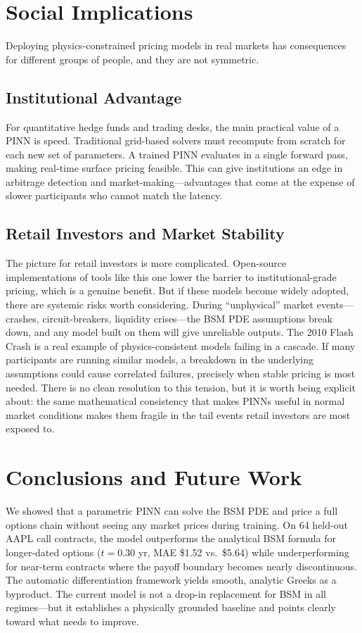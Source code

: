 \documentclass[11pt, twocolumn]{article}
\begin{document}
\section{Social Implications}
Deploying physics-constrained pricing models in real markets has consequences for different groups of people, and they are not symmetric.

\subsection{Institutional Advantage}
For quantitative hedge funds and trading desks, the main practical value of a PINN is speed. Traditional grid-based solvers must recompute from scratch for each new set of parameters. A trained PINN evaluates in a single forward pass, making real-time surface pricing feasible. This can give institutions an edge in arbitrage detection and market-making—advantages that come at the expense of slower participants who cannot match the latency.

\subsection{Retail Investors and Market Stability}
The picture for retail investors is more complicated. Open-source implementations of tools like this one lower the barrier to institutional-grade pricing, which is a genuine benefit. But if these models become widely adopted, there are systemic risks worth considering. During ``unphysical'' market events—crashes, circuit-breakers, liquidity crises—the BSM PDE assumptions break down, and any model built on them will give unreliable outputs. The 2010 Flash Crash is a real example of physics-consistent models failing in a cascade. If many participants are running similar models, a breakdown in the underlying assumptions could cause correlated failures, precisely when stable pricing is most needed. There is no clean resolution to this tension, but it is worth being explicit about: the same mathematical consistency that makes PINNs useful in normal market conditions makes them fragile in the tail events retail investors are most exposed to.

\section{Conclusions and Future Work}
We showed that a parametric PINN can solve the BSM PDE and price a full options chain without seeing any market prices during training. On 64 held-out AAPL call contracts, the model outperforms the analytical BSM formula for longer-dated options ($t=0.30$ yr, MAE \$1.52 vs.\ \$5.64) while underperforming for near-term contracts where the payoff boundary becomes nearly discontinuous. The automatic differentiation framework yields smooth, analytic Greeks as a byproduct. The current model is not a drop-in replacement for BSM in all regimes---but it establishes a physically grounded baseline and points clearly toward what needs to improve.
\end{document}
